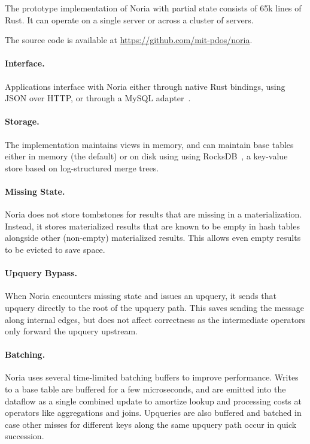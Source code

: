 The prototype implementation of Noria with partial state consists of 65k lines
of Rust. It can operate on a single server or across a cluster of servers.

The source code is available at \url{https://github.com/mit-pdos/noria}.

\paragraph{Interface.}
Applications interface with Noria either through native Rust bindings, using
JSON over HTTP, or through a MySQL adapter~\cite{noria-mysql}.

\paragraph{Storage.}
The implementation maintains views in memory, and can maintain base tables
either in memory (the default) or on disk using using RocksDB~\cite{rocksdb}, a
key-value store based on log-structured merge trees.

\paragraph{Missing State.}
Noria does not store tombstones for results that are missing in a
materialization. Instead, it stores materialized results that are known to be
empty in hash tables alongside other (non-empty) materialized results. This
allows even empty results to be evicted to save space.

\paragraph{Upquery Bypass.}
When Noria encounters missing state and issues an upquery, it sends that
upquery directly to the root of the upquery path. This saves sending the
message along internal edges, but does not affect correctness as the
intermediate operators only forward the upquery upstream.

\paragraph{Batching.}
Noria uses several time-limited batching buffers to improve performance. Writes
to a base table are buffered for a few microseconds, and are emitted into the
dataflow as a single combined update to amortize lookup and processing costs at
operators like aggregations and joins. Upqueries are also buffered and batched
in case other misses for different keys along the same upquery path occur in
quick succession.

